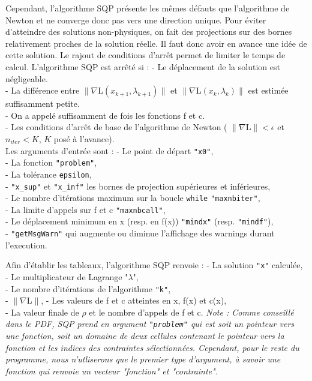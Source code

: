Cependant, l'algorithme SQP présente les mêmes défauts que l'algorithme de Newton et ne converge donc pas vers une direction unique. Pour éviter d'atteindre des solutions non-physiques, on fait des projections sur des bornes relativement proches de la solution réelle. Il faut donc avoir en avance une idée de cette solution.\bigbreak
\indent Le rajout de conditions d'arrêt permet de limiter le temps de calcul. L'algorithme SQP est arrêté si :\medbreak
- Le déplacement de la solution est négligeable.\\
\indent- La différence entre $\|    \nabla$L$(x_{k+1},\lambda_{k+1})   \| $ et $\|    \nabla $L$(x_{k},\lambda_{k})   \|$ est estimée suffisamment petite.\\
\indent- On a appelé suffisamment de fois les fonctions f et c.\\
\indent- Les conditions d'arrêt de base de l'algorithme de Newton ( $\| \nabla $L$ \| < \epsilon$ et $n_{iter} < K$, $K$ posé à l'avance).\\
\newpage
Les arguments d'entrée sont :\medbreak
\indent- Le point de départ \texttt{"x0"},\\
\indent- La fonction \texttt{"problem"},\\
\indent- La tolérance \texttt{epsilon},\\
\indent- \texttt{"x\_sup"} et \texttt{"x\_inf"} les bornes de projection supérieures et inférieures,\\
\indent- Le nombre d'itérations maximum sur la boucle \texttt{while} \texttt{"maxnbiter"},\\
\indent- La limite d'appels sur f et c \texttt{"maxnbcall"},\\
\indent- Le déplacement minimum en x (resp. en f(x)) \texttt{"mindx"} (resp. \texttt{"mindf"}),\\
\indent- \texttt{"getMsgWarn"} qui augmente ou diminue l'affichage des warnings durant l'execution.\medbreak

Afin d'établir les tableaux, l'algorithme SQP renvoie :\medbreak
\indent- La solution \texttt{"x"} calculée,\\
\indent- Le multiplicateur de Lagrange "$\lambda$",\\
\indent- Le nombre d'itérations de l'algorithme \texttt{"k"},\\
\indent- $\| \nabla$L$ \|$,
\indent- Les valeurs de f et c atteintes en x, f(x) et c(x),\\
\indent- La valeur finale de $\rho$ et le nombre d'appels de f et c.
\bigbreak
\textit{Note : Comme conseillé dans le PDF, SQP prend en argument \texttt{"problem"} qui est soit un pointeur vers une fonction, soit un domaine de deux cellules contenant le pointeur vers la fonction et les indices des contraintes sélectionnées. Cependant, pour le reste du programme, nous n'utliserons que le premier type d'argument, à savoir une fonction qui renvoie un vecteur "fonction" et "contrainte".}\bigbreak

